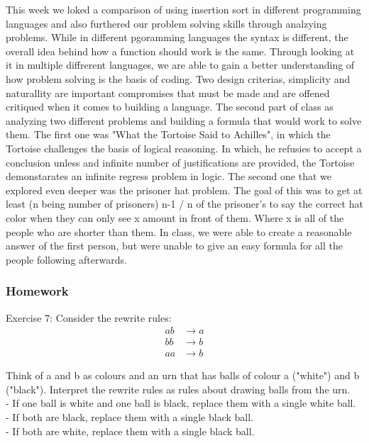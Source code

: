 \documentclass{article}
\theoremstyle{theorem}
\theoremstyle{definition}
\theoremstyle{remark}
\begin{document}
This week we loked a comparison of using insertion sort in different programming languages and also furthered our problem solving skills through analzying problems. 
While in different pgoramming languages the syntax is different, the overall idea behind how a function should work is the same. Through looking at it in multiple diffrerent languages,
we are able to gain a better understanding of how problem solving is the basis of coding. Two design criterias, simplicity and naturallity are important compromises that must be made
and are offened critiqued when it comes to building a language. The second part of class as analyzing two different problems and building a formula that would work to solve them.
The first one was "What the Tortoise Said to Achilles", in which the Tortoise challenges the basis of logical reasoning. In which, he refusies to accept a conclusion unless
and infinite number of justifications are provided, the Tortoise demonstarates an infinite regress problem in logic. The second one that we explored even deeper was the prisoner hat problem. 
The goal of this was to get at least (n being number of prisoners) n-1 / n of the prisoner's to say the correct hat color when they can only see x amount in front of them. Where x is all of the people who are shorter than them.
In class, we were able to create a reasonable answer of the first person, but were unable to give an easy formula for all the people following afterwards. 

\subsubsection{Homework}

Exercise 7: Consider the rewrite rules: \\
\begin{align*}
  ab &\rightarrow a \\
  bb &\rightarrow b \\
  aa &\rightarrow b
\end{align*}

Think of a and b as colours and an urn that has balls of colour a ("white") and b ("black"). Interpret the rewrite rules as rules about drawing balls from the urn. \\
- If one ball is white and one ball is black, replace them with a single white ball. \\
- If both are black, replace them with a single black ball. \\
- If both are white, replace them with a single black ball.
\end{document}
